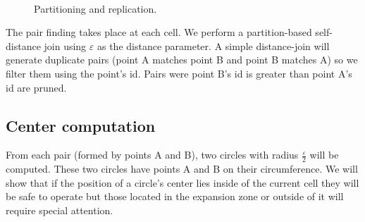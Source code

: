 \documentclass[twocolumn]{IEEEtran}
\begin{document}
\begin{figure}[htbp]
  \centering
  \\
  \caption{Partitioning and replication.}
  \label{fig:input}
\end{figure}

The pair finding takes place at each cell.  We perform a partition-based self-distance join using  $\varepsilon$ as the distance parameter.  A simple distance-join will generate duplicate pairs (point A matches point B and point B matches A) so we filter them using the point's id. Pairs were point B's id is greater than point A's id are pruned. 

\subsection*{Center computation}
From each pair (formed by points A and B), two circles with radius $\frac{\varepsilon}{2}$ will be computed.  These two circles have points A and B on their circumference. We will show that if the position of a circle's center lies inside of the current cell they will be safe to operate but those located in the expansion zone or outside of it will require special attention.  
\end{document}
